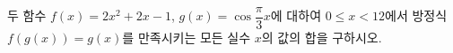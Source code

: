 두 함수 $f(x)=2x^2+2x-1$, $g(x)=\cos\dfrac{\pi}{3}x$에 대하여 $0\le x<12$에서 방정식 $f(g(x))=g(x)$를 만족시키는 모든 실수 $x$의 값의 합을 구하시오.
